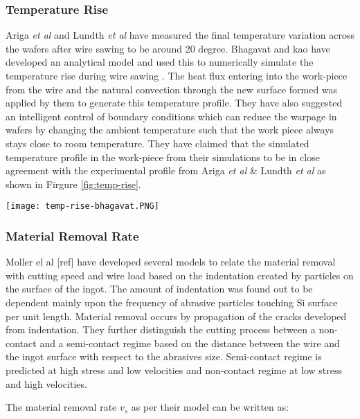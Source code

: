 \subsubsection{Temperature Rise}
Ariga \textit{et al}  \cite{ariga2003wire} and Lundth \textit{et al} \cite{} have measured the final temperature variation across the wafers after wire sawing to be around 20 degree. Bhagavat and kao \cite{} have developed an analytical model and used this to numerically simulate the temperature rise during wire sawing \cite{}. The heat flux entering into the work-piece from the wire and the natural convection through the new surface formed was applied by them to generate this temperature profile. They have also suggested an intelligent control of boundary conditions which can reduce the warpage in wafers by changing the ambient temperature such that the work piece always stays close to room temperature. They have claimed that the simulated temperature profile in the work-piece from their simulations to be in close agreement with the experimental profile from Ariga \textit{et al} \& Lundth \textit{et al} as shown in Firgure \ref{fig:temp-rise}.
\newline
\noindent
\begin{minipage}[c]{\textwidth}
\centering
        \texttt{[image: temp-rise-bhagavat.PNG]}
        \label{fig:temp-rise}
 \end{minipage}

\subsubsection{Material Removal Rate}
Moller el al [ref] have developed several models to relate the material removal with cutting speed and wire load based on the indentation created by particles on the surface of the ingot. The amount of indentation was found out to be dependent mainly upon the frequency of abrasive particles touching Si surface per unit length. Material removal occurs by propagation of the cracks developed from indentation. They further distinguish the cutting process between a non-contact and a semi-contact regime based on the distance between the wire and the ingot surface with respect to the abrasives size. Semi-contact regime is predicted at high stress and low velocities and non-contact regime at low stress and high velocities.

The material removal rate $v_{s}$ as per their model can be written as:

